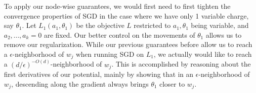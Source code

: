 To apply our node-wise guarantees, we would first need to first tighten the convergence properties of SGD in the case where we have only 1 variable charge, say $\theta_1$. Let $L_1(a_1,\theta_1)$ be the objective $L$ restricted to $a_1,\theta_1$ being variable, and $a_2,...,a_k = 0$ are fixed. Our better control on the movements of $\theta_1$ allows us to remove our regularization. While our previous guarantees before allow us to reach a $\epsilon$-neighborhood of $w_j$ when running SGD on $L_1$, we actually would like to reach a $(d/\epsilon)^{-O(d)}$-neighborhood of $w_j$. This is accomplished by reasoning about the first derivatives of our potential, mainly by showing that in an $\epsilon$-neighborhood of $w_j$, descending along the gradient always brings $\theta_1$ closer to $w_j$.

%

